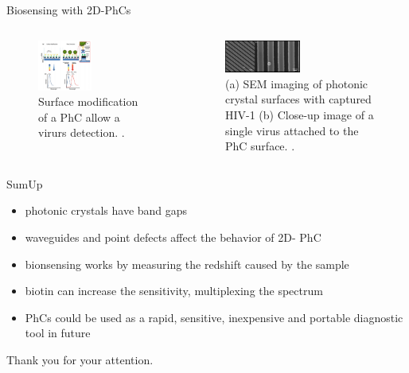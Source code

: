 \begin{frame}{Biosensing with 2D-PhCs}
\begin{columns}
  \begin{column}{0.48\textwidth}
    \begin{figure}
      \centering
      \includegraphics[width=0.5\textwidth]{./bilder/reflektion.png}
      \caption{Surface modification of a PhC allow a virurs detection. \cite{nano}.}
      \label{fig: virus detection}
    \end{figure}
  \end{column}

  \begin{column}{0.48\textwidth}
    \begin{figure}
      \centering
      \includegraphics[width=0.5\textwidth]{./bilder/virus_surface.png}
      \caption{(a) SEM imaging of photonic crystal surfaces with captured HIV-1 (b) Close-up image of a single virus attached to the PhC surface. \cite{virus_surface}.}
      \label{fig: virus_on_surface}
    \end{figure}
  \end{column}
\end{columns}

\end{frame}

\begin{frame}{SumUp}
  \begin{itemize}
    \setlength\itemsep{1.2em}
    \item{photonic crystals have band gaps}
    \item{waveguides and point defects affect the behavior of 2D- PhC}
    \item{bionsensing works by measuring the redshift caused by the sample}
    \item{biotin can increase the sensitivity, multiplexing the spectrum}
    \item{PhCs could be used as a rapid, sensitive, inexpensive and portable diagnostic tool in future}
  \end{itemize}
\end{frame}

\begin{frame}
  Thank you for your attention.
\end{frame}

\begin{frame}[allowframebreaks]
  \nocite{*}
  \printbibliography
\end{frame}

